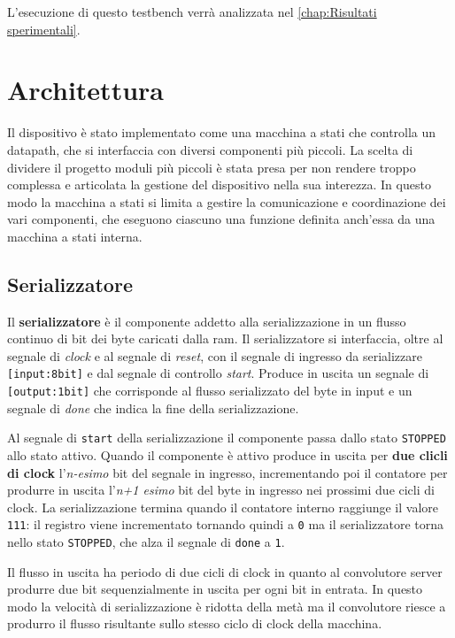 \documentclass[a4paper]{report}
\begin{document}
L'esecuzione di questo testbench verrà analizzata nel \autoref{chap:Risultati sperimentali}.


\chapter{Architettura}
Il dispositivo è stato implementato come una macchina a stati che controlla un datapath, che si interfaccia con diversi componenti più piccoli. La scelta di dividere il progetto moduli più piccoli è stata presa per non rendere troppo complessa e articolata la gestione del dispositivo nella sua interezza. In questo modo la macchina a stati si limita a gestire la comunicazione e coordinazione dei vari componenti, che eseguono ciascuno una funzione definita anch'essa da una macchina a stati interna.

\section{Serializzatore}

Il \textbf{serializzatore} è il componente addetto alla serializzazione in un flusso continuo di bit dei byte caricati dalla ram.
Il serializzatore si interfaccia, oltre al segnale di \textit{clock} e al segnale di \textit{reset}, con il segnale di ingresso da serializzare \texttt{[input:8bit]} e dal segnale di controllo \textit{start}. Produce in uscita un segnale di \texttt{[output:1bit]} che corrisponde al flusso serializzato del byte in input e un segnale di \textit{done} che indica la fine della serializzazione.

Al segnale di \texttt{start} della serializzazione il componente passa dallo stato \texttt{STOPPED} allo stato attivo. Quando il componente è attivo produce in uscita per \textbf{due clicli di clock} l'\textit{n-esimo} bit del segnale in ingresso, incrementando poi il contatore per produrre in uscita l'\textit{n+1 esimo} bit del byte in ingresso nei prossimi due cicli di clock. La serializzazione termina quando il contatore interno raggiunge il valore \texttt{111}: il registro viene incrementato tornando quindi a \texttt{0} ma il serializzatore torna nello stato \texttt{STOPPED}, che alza il segnale di \texttt{done} a \texttt{1}.

Il flusso in uscita ha periodo di due cicli di clock in quanto al convolutore server produrre due bit sequenzialmente in uscita per ogni bit in entrata. In questo modo la velocità di serializzazione è ridotta della metà ma il convolutore riesce a produrro il flusso risultante sullo stesso ciclo di clock della macchina.
\end{document}
